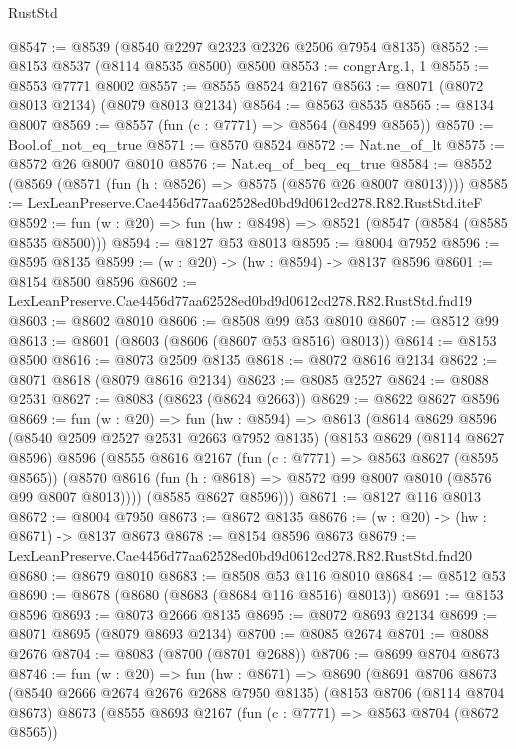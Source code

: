 \begin{lexlean}{RustStd}
\begin{coremodule}
@8547 := @8539 (@8540 @2297 @2323 @2326 @2506 @7954 @8135)
@8552 := @8153 @8537 (@8114 @8535 @8500) @8500
@8553 := congrArg.{1, 1}
@8555 := @8553 @7771 @8002
@8557 := @8555 @8524 @2167
@8563 := @8071 (@8072 @8013 @2134) (@8079 @8013 @2134)
@8564 := @8563 @8535
@8565 := @8134 @8007
@8569 := @8557 (fun (c : @7771) => @8564 (@8499 @8565))
@8570 := Bool.of_not_eq_true
@8571 := @8570 @8524
@8572 := Nat.ne_of_lt
@8575 := @8572 @26 @8007 @8010
@8576 := Nat.eq_of_beq_eq_true
@8584 := @8552 (@8569 (@8571 (fun (h : @8526) => @8575 (@8576 @26 @8007 @8013))))
@8585 := LexLeanPreserve.Cae4456d77aa62528ed0bd9d0612cd278.R82.RustStd.iteF
@8592 := fun (w : @20) => fun (hw : @8498) => @8521 (@8547 (@8584 (@8585 @8535 @8500)))
@8594 := @8127 @53 @8013
@8595 := @8004 @7952
@8596 := @8595 @8135
@8599 := (w : @20) -> (hw : @8594) -> @8137 @8596
@8601 := @8154 @8500 @8596
@8602 := LexLeanPreserve.Cae4456d77aa62528ed0bd9d0612cd278.R82.RustStd.fnd19
@8603 := @8602 @8010
@8606 := @8508 @99 @53 @8010
@8607 := @8512 @99
@8613 := @8601 (@8603 (@8606 (@8607 @53 @8516) @8013))
@8614 := @8153 @8500
@8616 := @8073 @2509 @8135
@8618 := @8072 @8616 @2134
@8622 := @8071 @8618 (@8079 @8616 @2134)
@8623 := @8085 @2527
@8624 := @8088 @2531
@8627 := @8083 (@8623 (@8624 @2663))
@8629 := @8622 @8627 @8596
@8669 := fun (w : @20) =>
  fun (hw : @8594) =>
  @8613
    (@8614
      @8629
      @8596
      (@8540 @2509 @2527 @2531 @2663 @7952 @8135)
      (@8153
        @8629
        (@8114 @8627 @8596)
        @8596
        (@8555
          @8616
          @2167
          (fun (c : @7771) => @8563 @8627 (@8595 @8565))
          (@8570 @8616 (fun (h : @8618) => @8572 @99 @8007 @8010 (@8576 @99 @8007 @8013))))
        (@8585 @8627 @8596)))
@8671 := @8127 @116 @8013
@8672 := @8004 @7950
@8673 := @8672 @8135
@8676 := (w : @20) -> (hw : @8671) -> @8137 @8673
@8678 := @8154 @8596 @8673
@8679 := LexLeanPreserve.Cae4456d77aa62528ed0bd9d0612cd278.R82.RustStd.fnd20
@8680 := @8679 @8010
@8683 := @8508 @53 @116 @8010
@8684 := @8512 @53
@8690 := @8678 (@8680 (@8683 (@8684 @116 @8516) @8013))
@8691 := @8153 @8596
@8693 := @8073 @2666 @8135
@8695 := @8072 @8693 @2134
@8699 := @8071 @8695 (@8079 @8693 @2134)
@8700 := @8085 @2674
@8701 := @8088 @2676
@8704 := @8083 (@8700 (@8701 @2688))
@8706 := @8699 @8704 @8673
@8746 := fun (w : @20) =>
  fun (hw : @8671) =>
  @8690
    (@8691
      @8706
      @8673
      (@8540 @2666 @2674 @2676 @2688 @7950 @8135)
      (@8153
        @8706
        (@8114 @8704 @8673)
        @8673
        (@8555
          @8693
          @2167
          (fun (c : @7771) => @8563 @8704 (@8672 @8565))

\end{coremodule}
\end{lexlean}
